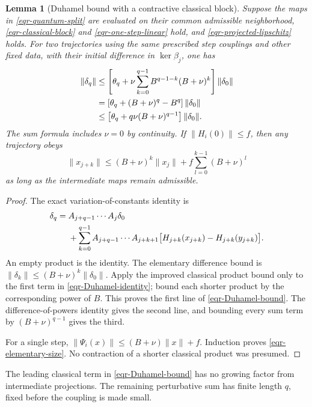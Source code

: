 \documentclass[11pt]{article}
\newtheorem{lemma}[theorem]{Lemma}
\theoremstyle{remark}
\begin{document}
\begin{lemma}[Duhamel bound with a contractive classical block]
\label{eqr-Duhamel-lemma}
Suppose the maps in \eqref{eqr-quantum-split} are evaluated on
their common admissible neighborhood,
\eqref{eqr-classical-block} and \eqref{eqr-one-step-linear} hold,
and \eqref{eqr-projected-lipschitz} holds. For two trajectories
using the same prescribed step couplings and other fixed data,
with their initial difference in $\ker\beta_j$, one has
\begin{align}
 \|\delta_q\|
 &\le\left[
 \theta_q+\nu\sum_{k=0}^{q-1}
                    B^{q-1-k}(B+\nu)^k\right]\|\delta_0\|
       \notag\\
 &=\left[\theta_q+(B+\nu)^q-B^q\right]\|\delta_0\|
       \notag\\
 &\le\left[\theta_q+q\nu(B+\nu)^{q-1}\right]\|\delta_0\|.
 \label{eqr-Duhamel-bound}
\end{align}
The sum formula includes $\nu=0$ by continuity.
If $\|H_i(0)\|\le f$, then any trajectory obeys
\begin{equation}
 \|x_{j+k}\|\le(B+\nu)^k\|x_j\|
                     +f\sum_{l=0}^{k-1}(B+\nu)^l
 \label{eqr-elementary-size}
\end{equation}
as long as the intermediate maps remain admissible.
\end{lemma}
\begin{proof}
The exact variation-of-constants identity is
\begin{align}
 \delta_q={}&A_{j+q-1}\cdots A_j\delta_0 \notag\\
 &+\sum_{k=0}^{q-1}A_{j+q-1}\cdots A_{j+k+1}
   \bigl[H_{j+k}(x_{j+k})-H_{j+k}(y_{j+k})\bigr].
 \label{eqr-Duhamel-identity}
\end{align}
An empty product is the identity. The elementary difference bound
is $\|\delta_k\|\le(B+\nu)^k\|\delta_0\|$.
Apply the improved classical product bound only to the first term
in \eqref{eqr-Duhamel-identity}; bound each shorter product by the
corresponding power of $B$. This proves the first line of
\eqref{eqr-Duhamel-bound}. The difference-of-powers identity gives
the second line, and bounding every sum term by
$(B+\nu)^{q-1}$ gives the third.

For a single step,
$\|\Psi_i(x)\|\le(B+\nu)\|x\|+f$.
Induction proves \eqref{eqr-elementary-size}.
No contraction of a shorter classical product was presumed.
\end{proof}

The leading classical term in \eqref{eqr-Duhamel-bound} has no
growing factor from intermediate projections. The remaining
perturbative sum has finite length $q$, fixed before the coupling
is made small.
\end{document}

